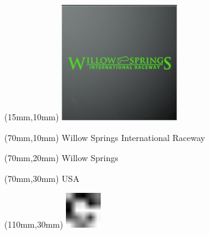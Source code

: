 \null\newpage
\begin{textblock*}{50mm}(15mm,10mm)%
\includegraphics[width=50mm]{LG/2015-05-20_00098.png}
\end{textblock*}
\begin{textblock*}{130mm}(70mm,10mm)%
{\fontsize{20}{20}\selectfont Willow Springs International Raceway}\\
\end{textblock*}
\begin{textblock*}{120mm}(70mm,20mm)%
{\fontsize{16}{16}\selectfont Willow Springs}\\
\end{textblock*}
\begin{textblock*}{120mm}(70mm,30mm)%
{\fontsize{12}{12}\selectfont USA}
\end{textblock*}
\begin{textblock*}{30mm}(110mm,30mm)%
\centering
\includegraphics[height=15mm]{icons/fa-rotate-right.pdf}
\end{textblock*}
